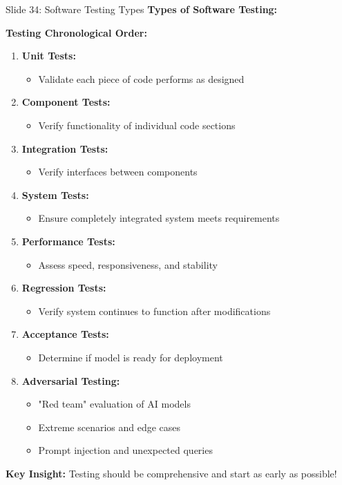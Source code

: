 \documentclass[8pt]{beamer}
\begin{document}
	\begin{frame}{Slide 34: Software Testing Types}
		\fontsize{6.5}{7.5}\selectfont
		\textbf{Types of Software Testing:}
		
		\vspace{0.1cm}
		\textbf{Testing Chronological Order:}
		\begin{enumerate}
			\item \textbf{Unit Tests:}
			\begin{itemize}
				\item Validate each piece of code performs as designed
			\end{itemize}
			\item \textbf{Component Tests:}
			\begin{itemize}
				\item Verify functionality of individual code sections
			\end{itemize}
			\item \textbf{Integration Tests:}
			\begin{itemize}
				\item Verify interfaces between components
			\end{itemize}
			\item \textbf{System Tests:}
			\begin{itemize}
				\item Ensure completely integrated system meets requirements
			\end{itemize}
			\item \textbf{Performance Tests:}
			\begin{itemize}
				\item Assess speed, responsiveness, and stability
			\end{itemize}
			\item \textbf{Regression Tests:}
			\begin{itemize}
				\item Verify system continues to function after modifications
			\end{itemize}
			\item \textbf{Acceptance Tests:}
			\begin{itemize}
				\item Determine if model is ready for deployment
			\end{itemize}
			\item \textbf{Adversarial Testing:}
			\begin{itemize}
				\item "Red team" evaluation of AI models
				\item Extreme scenarios and edge cases
				\item Prompt injection and unexpected queries
			\end{itemize}
		\end{enumerate}
		
		\textcolor{myblue}{\textbf{Key Insight:}} Testing should be \textcolor{myblue}{comprehensive and start as early as possible}!
	\end{frame}
	
\end{document}
